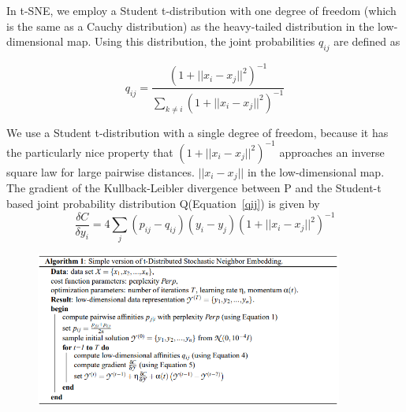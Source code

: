 \documentclass[12pt]{article}
\theoremstyle{plain}
\begin{document}
In t-SNE, we employ a Student t-distribution with one degree of freedom (which is the same as a Cauchy distribution) as the heavy-tailed distribution in the low-dimensional map. Using this
distribution, the joint probabilities $q_{ij}$ are defined as

\begin{equation}
q_{ij}= \frac{(1+||x_i-x_j||^2)^{-1}}{\sum_{k \neq i}(1+||x_i-x_j||^2)^{-1}}
\label{qij}
\end{equation}


We use a Student t-distribution with a single degree of freedom, because it has the particularly nice property that $(1+||x_i-x_j||^2)^{-1}$ approaches an inverse square law for large pairwise distances. $||x_i-x_j||$ in the low-dimensional map.
\\


The gradient of the Kullback-Leibler divergence between P and the Student-t based joint probability distribution Q(Equation~\ref{qij}) is given by
\begin{equation}
\frac{\delta C}{\delta y_i} = 4\sum_j(p_{ij}-q_{ij})(y_i-y_j)(1+||x_i-x_j||^2)^{-1}
\end{equation}

\begin{figure}[h!]
 \begin{center}
  \includegraphics[width=0.9\textwidth]{media/alg.png}
 \end{center}
\end{figure}



\end{document}
